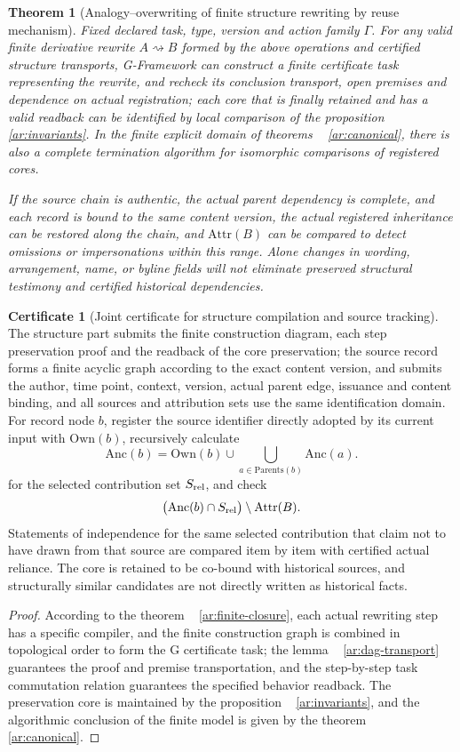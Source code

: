 \documentclass[11pt,a4paper]{article}
\theoremstyle{plain}
\newtheorem{theorem}{Theorem}[section]
\theoremstyle{definition}
\newtheorem*{certificate}{Certificate}
\theoremstyle{remark}
\begin{document}
\begin{CJK*}
\begin{theorem}
[Analogy--overwriting of finite structure rewriting by reuse mechanism]\label{ar:main}
Fixed declared task, type, version and action family $\Gamma$. For any valid finite derivative rewrite $A\rightsquigarrow B$ formed by the above operations and certified structure transports, G-Framework can construct a finite certificate task representing the rewrite, and recheck its conclusion transport, open premises and dependence on actual registration; each core that is finally retained and has a valid readback can be identified by local comparison of the proposition ~ \ref{ar:invariants}. In the finite explicit domain of theorems ~ \ref{ar:canonical}, there is also a complete termination algorithm for isomorphic comparisons of registered cores.

If the source chain is authentic, the actual parent dependency is complete, and each record is bound to the same content version, the actual registered inheritance can be restored along the chain, and $\mathrm{Attr}(B)$ can be compared to detect omissions or impersonations within this range. Alone changes in wording, arrangement, name, or byline fields will not eliminate preserved structural testimony and certified historical dependencies.\end{theorem}
\begin{certificate}
[Joint certificate for structure compilation and source tracking]The structure part submits the finite construction diagram, each step preservation proof and the readback of the core preservation; the source record forms a finite acyclic graph according to the exact content version, and submits the author, time point, context, version, actual parent edge, issuance and content binding, and all sources and attribution sets use the same identification domain. For record node $b$, register the source identifier directly adopted by its current input with $\mathrm{Own}(b)$, recursively calculate \[
 \mathrm{Anc}(b)=\mathrm{Own}(b)\cup
       \bigcup_{a\in\mathrm{Parents}(b)}\mathrm{Anc}(a).
\] for the selected contribution set $S_{\rm rel}$, and check \[
 \bigl(\mathrm{Anc}(b)\cap S_{\rm rel}\bigr)
       \setminus\mathrm{Attr}(B).
\] Statements of independence for the same selected contribution that claim not to have drawn from that source are compared item by item with certified actual reliance. The core is retained to be co-bound with historical sources, and structurally similar candidates are not directly written as historical facts.\end{certificate}
\begin{proof}
According to the theorem ~ \ref{ar:finite-closure}, each actual rewriting step has a specific compiler, and the finite construction graph is combined in topological order to form the G certificate task; the lemma ~ \ref{ar:dag-transport} guarantees the proof and premise transportation, and the step-by-step task commutation relation guarantees the specified behavior readback. The preservation core is maintained by the proposition ~ \ref{ar:invariants}, and the algorithmic conclusion of the finite model is given by the theorem ~ \ref{ar:canonical}.


\end{proof}
\end{CJK*}
\end{document}

